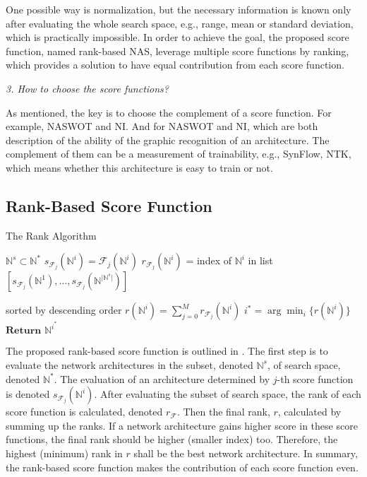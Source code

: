 \documentclass[sigconf]{acmart}
\begin{document}
    One possible way is normalization, but the necessary information is known only 
    after evaluating the whole search space, e.g., range, mean or standard deviation, which is practically 
    impossible. In order to achieve the goal, the proposed score function, named rank-based NAS, leverage 
    multiple score functions by ranking, which provides a solution to have equal contribution from each 
    score function. 

    \textit{3. How to choose the score functions?}

    As mentioned, the key is to choose the complement of a score function. For example, 
    NASWOT and NI. And for NASWOT and NI, which are both description of the ability of 
    the graphic recognition of an architecture. The complement of them can be a measurement 
    of trainability, e.g., SynFlow, NTK, which means whether this architecture is easy to 
    train or not. 

    \subsection{Rank-Based Score Function}
    \begin{algorithm}[h]
        \caption{The Rank Algorithm}\label{alg:rank-based}
        \begin{algorithmic}[1]
            \Input ${\mathbb N}^{s}\subset{\mathbb N}^{*}$
                    \State $s_{{\mathcal F}_{j}}({\mathbb N}^i)={\mathcal F}_{j}({\mathbb N}^i)$
                \EndFor
            \EndFor
                \State $r_{{\mathcal F}_{j}}({\mathbb N}^i)$ = index of ${\mathbb N}^i$ in list $[s_{{\mathcal F}_{j}}({\mathbb N}^1),\ldots,s_{{\mathcal F}_{j}}({\mathbb N}^{\lvert {\mathbb N}^s\rvert})]$ \par sorted by descending order
            \EndFor
            \State $r({\mathbb N}^i)=\sum^M_{j=0} r_{{\mathcal F}_{j}}({\mathbb N}^i)$
            \State $i^*=\arg\min_{i}\{r({\mathbb N}^i)\}$
            \State $\textbf{Return }{\mathbb N}^{i^*}$
        \end{algorithmic}
    \end{algorithm}

    The proposed rank-based score function is outlined in . The first step is to evaluate the 
    network architectures in the subset, denoted $\mathbb N^s$, of search space, denoted $\mathbb N^*$. The evaluation 
    of an architecture determined by $j$-th score function is denoted $s_{\mathcal F_j}(\mathbb N^i)$. After evaluating 
    the subset of search space, the rank of each score function is calculated, denoted $r_{\mathcal F}$. Then the final 
    rank, $r$, calculated by summing up the ranks. 
    If a network architecture gains higher score in these score functions, the final rank should be higher (smaller index) too. 
    Therefore, the highest (minimum) rank in $r$ shall be the best network architecture. In summary, the rank-based score 
    function makes the contribution of each score function even. 
\end{document}
